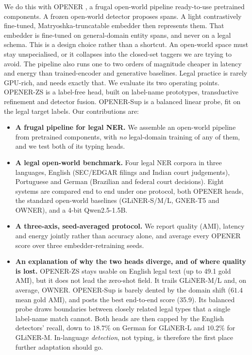 We do this with OPENER , a frugal open-world pipeline  ready-to-use pretrained components. A frozen open-world detector proposes spans. A light contrastively fine-tuned, Matryoshka-truncatable embedder then represents them. That embedder is fine-tuned on general-domain entity spans, and never on a legal schema. This is a design choice rather than a shortcut. An open-world space must stay unspecialised, or it collapses into the closed-set taggers we are trying to avoid. The pipeline also runs one to two orders of magnitude cheaper in latency and energy than trained-encoder and generative baselines. Legal practice is rarely GPU-rich, and needs exactly that. We evaluate its two operating points. OPENER-ZS is a label-free head, built on label-name prototypes, transductive refinement and detector fusion. OPENER-Sup is a balanced linear probe, fit on the legal target labels. Our contributions are:
\begin{itemize}
\item \textbf{A frugal pipeline for legal NER.} We assemble an open-world pipeline from pretrained components, with \emph{no} legal-domain training of any of them, and we test both of its typing heads.
\item \textbf{A legal open-world benchmark.} Four legal NER corpora in three languages, English (SEC/EDGAR filings and Indian court judgements), Portuguese and German (Brazilian and federal court decisions). Eight systems are compared end to end under one protocol, both OPENER heads, the standard open-world baselines (GLiNER-S/M/L, GNER-T5 and OWNER), and a 4-bit Qwen2.5-1.5B.
\item \textbf{A three-axis, seed-averaged protocol.} We report quality (AMI), latency and energy jointly rather than accuracy alone, and average every OPENER score over three embedder-retraining seeds.
\item \textbf{An explanation of why the two heads diverge, and of where quality is lost.} OPENER-ZS stays usable on English legal text (up to 49.1 gold AMI), but it does not lead the zero-shot field. It trails GLiNER-M/L and, on average, OWNER. OPENER-Sup is barely dented by the domain shift ($61.4$ mean gold AMI), and posts the best end-to-end score (35.9). Its balanced probe draws boundaries between closely related legal types that a single label-name match cannot.  Both heads are then capped by the English detectors' recall, down to $18.7\%$ on German for GLiNER-L and $10.2\%$ for GLiNER-M. In-language \emph{detection}, not typing, is therefore the first place further adaptation should go.
\end{itemize}
